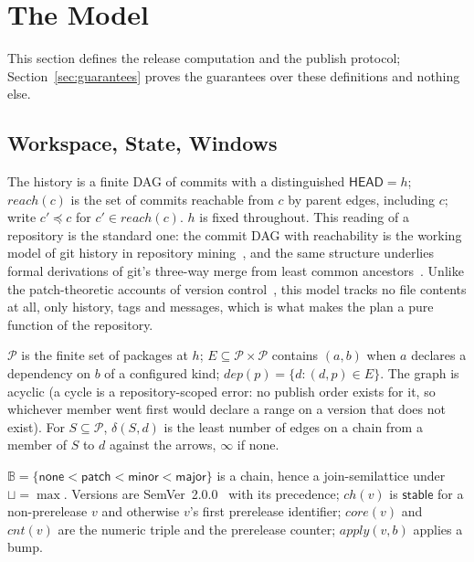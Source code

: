 \documentclass[sigconf,nonacm]{acmart}
\begin{document}
\section{The Model}
\label{sec:model}

This section defines the release computation and the publish protocol;
Section~\ref{sec:guarantees} proves the guarantees over these
definitions and nothing else.

\subsection{Workspace, State, Windows}

\begin{definition}[history]
The history is a finite DAG of commits with a distinguished
$\mathsf{HEAD} = h$; $\mathit{reach}(c)$ is the set of commits reachable
from $c$ by parent edges, including $c$; write $c' \preceq c$ for
$c' \in \mathit{reach}(c)$. $h$ is fixed throughout. This reading of a
repository is the standard one: the commit DAG with reachability is the
working model of git history in repository mining~\cite{birdgit}, and
the same structure underlies formal derivations of git's three-way
merge from least common ancestors~\cite{mrdt}. Unlike the
patch-theoretic accounts of version
control~\cite{swierstraloh,hpt,mimram}, this model tracks no file
contents at all, only history, tags and messages, which is what
makes the plan a pure function of the repository.
\end{definition}

\begin{definition}[workspace]
$\mathcal{P}$ is the finite set of packages at $h$; $E \subseteq
\mathcal{P} \times \mathcal{P}$ contains $(a,b)$ when $a$ declares a
dependency on $b$ of a configured kind; $\mathit{dep}(p) = \{d : (d,p)
\in E\}$. The graph is acyclic (a cycle is a repository-scoped error: no
publish order exists for it, so whichever member went first would
declare a range on a version that does not exist). For $S \subseteq
\mathcal{P}$, $\delta(S,d)$ is the least number of edges on a chain from
a member of $S$ to $d$ against the arrows, $\infty$ if none.
\end{definition}

\begin{definition}
$\mathbb{B} = \{\mathsf{none} < \mathsf{patch} < \mathsf{minor} <
\mathsf{major}\}$ is a chain, hence a join-semilattice under
$\sqcup = \max$. Versions are SemVer~2.0.0~\cite{semver} with its
precedence; $\mathit{ch}(v)$ is $\mathsf{stable}$ for a non-prerelease
$v$ and otherwise $v$'s first prerelease identifier; $\mathit{core}(v)$
and $\mathit{cnt}(v)$ are the numeric triple and the prerelease counter;
$\mathit{apply}(v,b)$ applies a bump.
\end{definition}
\end{document}
